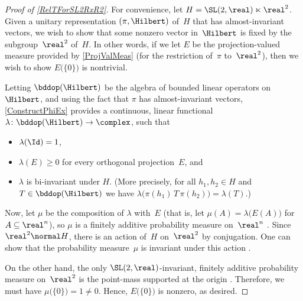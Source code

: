 
\begin{proof}[Proof of \cref{RelTForSL2RxR2}]
For convenience, let $H = \SL(2,\real) \ltimes \real^2$. %
Given a unitary representation $(\pi,\Hilbert)$ of~$H$ that has almost-invariant vectors, we wish to show that some nonzero vector in~$\Hilbert$ is fixed by the subgroup~$\real^2$ of~$H$. In other words, if we let $E$ be the projection-valued measure provided by \cref{ProjValMeas} (for the restriction of~$\pi$ to~$\real^2$), then we wish to show $E \bigl( \{0\} \bigr)$ is nontrivial.

Letting 
	$\bddop(\Hilbert)$ 
	be the algebra of bounded linear operators on~$\Hilbert$, and using the fact that $\pi$ has almost-invariant vectors, \cref{ConstructPhiEx} provides a continuous, linear functional $\lambda \colon \bddop(\Hilbert) \to \complex$, such that 
	\begin{itemize}
	\item $\lambda(\Id) = 1$,
	\item $\lambda( E ) \ge 0$ for every orthogonal projection~$E$,
	and
	\item $\lambda$ is bi-invariant under $H$. (More precisely, for all $h_1,h_2 \in H$ and $T \in \bddop(\Hilbert)$ we have $\lambda \bigl( \pi(h_1) \, T  \, \pi(h_2) \bigr) = \lambda(T)$.)
	\end{itemize}

Now, let $\mu$ be the composition of $\lambda$ with~$E$ (that is, let $\mu(A) = \lambda \bigl(E(A) \bigr)$ for $A \subseteq \real^n$), so $\mu$ is a finitely additive probability measure on~$\real^n$ . Since $\real^2 \normal H$, there is an action of~$H$ on~$\real^2$ by conjugation. One can show that the probability measure~$\mu$ is invariant under this action .

On the other hand, the only $\SL(2,\real)$-invariant, finitely additive probability measure on~$\real^2$ is the point-mass supported at the origin . 
Therefore, we must have $\mu \bigl( \{0\} \bigr) = 1 \neq 0$. Hence, $E \bigl( \{0\} \bigr)$ is nonzero, as desired. 
\end{proof}

